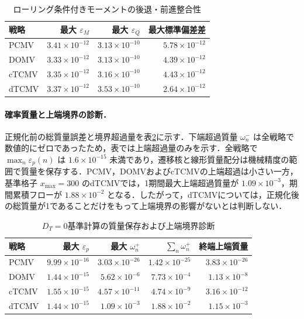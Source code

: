 \documentclass[10pt,a4paper]{article}
\theoremstyle{plain}
\theoremstyle{definition}
\begin{document}
\begin{table}[htbp]
\centering
\caption{ローリング条件付きモーメントの後退・前進整合性}
\label{tab:rolling-validation-D0}
\begin{tabular}{lrrr}
\toprule
戦略 & 最大 $\varepsilon_M$ & 最大 $\varepsilon_Q$ & 最大標準偏差差 \\
\midrule
PCMV & $3.41\times10^{-12}$ & $3.13\times10^{-10}$ & $5.78\times10^{-12}$ \\
DOMV & $3.33\times10^{-12}$ & $3.13\times10^{-10}$ & $4.39\times10^{-12}$ \\
cTCMV & $3.35\times10^{-12}$ & $3.16\times10^{-10}$ & $4.43\times10^{-12}$ \\
dTCMV & $3.37\times10^{-12}$ & $3.53\times10^{-10}$ & $2.64\times10^{-12}$ \\
\bottomrule
\end{tabular}

\end{table}

\paragraph{確率質量と上端境界の診断．}
正規化前の総質量誤差と境界超過量を表\ref{tab:mass-truncation-D0}に示す．下端超過質量 $\omega_n^{-}$ は全戦略で数値的にゼロであったため，表では上端超過量のみを示す．全戦略で $\max_n\varepsilon_p(n)$ は $1.6\times10^{-15}$ 未満であり，遷移核と線形質量配分は機械精度の範囲で質量を保存する．PCMV，DOMVおよびcTCMVの上端超過は小さい一方，基準格子 $x_{\max}=300$ のdTCMVでは，1期間最大上端超過質量が $1.09\times10^{-3}$，期間累積フローが $1.88\times10^{-2}$ となる．したがって，dTCMVについては，正規化後の総質量が1であることだけをもって上端境界の影響がないとは判断しない．

\begin{table}[htbp]
\centering
\small
\caption{$D_T=0$基準計算の質量保存および上端境界診断}
\label{tab:mass-truncation-D0}
\begin{tabular}{lrrrr}
\toprule
戦略 & 最大 $\varepsilon_p$ & 最大 $\omega_n^+$ & $\sum_n\omega_n^+$ & 終端上端質量 \\
\midrule
PCMV  & $9.99\times10^{-16}$ & $3.03\times10^{-26}$ & $1.42\times10^{-25}$ & $3.83\times10^{-26}$ \\
DOMV  & $1.44\times10^{-15}$ & $5.62\times10^{-6}$  & $7.73\times10^{-4}$  & $1.13\times10^{-8}$ \\
cTCMV & $1.55\times10^{-15}$ & $4.57\times10^{-11}$ & $4.74\times10^{-9}$  & $3.16\times10^{-12}$ \\
dTCMV & $1.44\times10^{-15}$ & $1.09\times10^{-3}$  & $1.88\times10^{-2}$  & $1.15\times10^{-3}$ \\
\bottomrule
\end{tabular}
\end{table}
\end{document}
